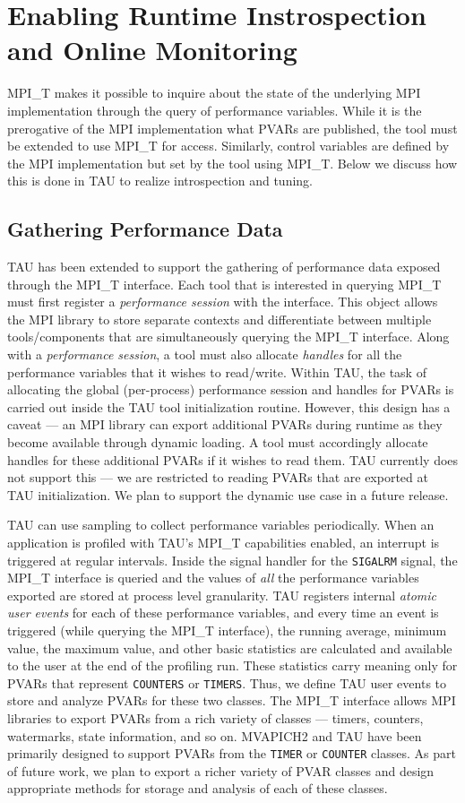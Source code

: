 \section{Enabling Runtime Instrospection and Online Monitoring}
MPI\_T makes it possible to inquire about the state of the underlying MPI implementation through the query of performance variables. While it is the prerogative of the MPI implementation what PVARs are published, the tool must be extended to use MPI\_T for access. Similarly, control variables are defined by the MPI implementation but set by the tool using MPI\_T. Below we discuss how this is done in TAU to realize introspection and tuning.
\subsection{Gathering Performance Data}
TAU has been extended to support the gathering of performance data exposed through the MPI\_T interface. Each tool that is interested in querying MPI\_T must first register a \textit{performance session} with the interface. This object allows the MPI library to store separate contexts and differentiate between multiple tools/components that are simultaneously querying the MPI\_T interface. Along with a \textit{performance session}, a tool must also allocate \textit{handles} for all the performance variables that it wishes to read/write. Within TAU, the task of allocating the global (per-process) performance session and handles for PVARs is carried out inside the TAU tool initialization routine. However, this design has a caveat --- an MPI library can export additional PVARs during runtime as they become available through dynamic loading. A tool must accordingly allocate handles for these additional PVARs if it wishes to read them. TAU currently does not support this --- we are restricted to reading PVARs that are exported at TAU initialization. We plan to support the dynamic use case in a future release.
\par TAU can use sampling to collect performance variables periodically. When an application is profiled with TAU's MPI\_T capabilities enabled, an interrupt is triggered at regular intervals. Inside the signal handler for the \verb+SIGALRM+ signal, the MPI\_T interface is queried and the values of \textit{all} the performance variables exported are stored at process level granularity. TAU registers internal \textit{atomic user events} for each of these performance variables, and every time an event is triggered (while querying the MPI\_T interface), the running average, minimum value, the maximum value, and other basic statistics are calculated and available to the user at the end of the profiling run. These statistics carry meaning only for PVARs that represent \verb+COUNTERS+ or \verb+TIMERS+. Thus, we define TAU user events to store and analyze PVARs for these two classes. The MPI\_T interface allows MPI libraries to export PVARs from a rich variety of classes --- timers, counters, watermarks, state information, and so on. MVAPICH2 and TAU have been primarily designed to support PVARs from the \verb+TIMER+ or \verb+COUNTER+ classes. As part of future work, we plan to export a richer variety of PVAR classes and design appropriate methods for storage and analysis of each of these classes.
